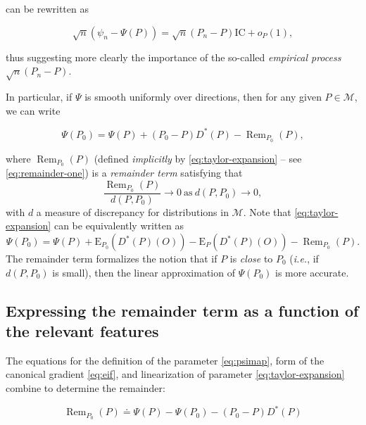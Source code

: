 \documentclass[11pt,openright,twoside]{book}
\DeclareMathOperator{\Rem}{Rem}
\newcommand{\defq}{\doteq}
\newcommand{\calM}{\mathcal{M}}
\newcommand{\Exp}{\textrm{E}}
\newcommand{\IC}{\textrm{IC}}
\theoremstyle{definition}
\theoremstyle{definition}
\theoremstyle{definition}
\theoremstyle{remark}
\begin{document}
can be rewritten as

\begin{equation*}
\sqrt{n} (\psi_n - \Psi(P)) = \sqrt{n} (P_{n} - P) \IC + o_P(1),
\end{equation*}

thus suggesting more clearly the importance of the so-called \emph{empirical
process} \(\sqrt{n} (P_{n} - P)\).

In particular, if \(\Psi\) is smooth uniformly over directions, then for any
given \(P \in \calM\), we can write

\begin{equation} 
\Psi(P_0)    =   \Psi(P)    +   (P_0    -   P)    D^*(P)   -    \Rem_{P_0}(P),
\label{eq:taylor-expansion} 
\end{equation}

where \(\Rem_{P_0}(P)\) (defined \emph{implicitly} by \eqref{eq:taylor-expansion} --
see \eqref{eq:remainder-one}) is a
\emph{remainder term} satisfying that \begin{equation*} \frac{\Rem_{P_0}(P)}{d(P,
P_0)} \rightarrow  0 \ \mbox{as} \  d(P, P_0) \rightarrow 0  , \end{equation*}
with \(d\) a measure of discrepancy for distributions in \(\calM\). Note that
\eqref{eq:taylor-expansion} can be equivalently written as \begin{equation*}
\Psi(P_0)   =   \Psi(P)   +  \Exp_{P_0}(D^*(P)(O))   -   \Exp_P(D^*(P)(O))   -
\Rem_{P_0}(P).  \end{equation*} The remainder term formalizes the notion that
if \(P\) is \emph{close} to \(P_0\) (\emph{i.e.}, if \(d(P,P_0)\) is small), then the linear
approximation of \(\Psi(P_0)\) is more accurate.

\hypertarget{expressing-the-remainder-term-as-a-function-of-the-relevant-features}{%
\subsection{Expressing the remainder term as a function of the relevant features}\label{expressing-the-remainder-term-as-a-function-of-the-relevant-features}}

The equations for the definition of the parameter \eqref{eq:psimap}, form of
the canonical gradient \eqref{eq:eif}, and linearization of parameter
\eqref{eq:taylor-expansion} combine to determine the remainder:

\begin{equation}
\Rem_{P_0}(P)    \defq   \Psi(P)    -   \Psi(P_0)    -   (P_0    -   P)D^*(P)
\label{eq:remainder-one}
\end{equation}
\end{document}
